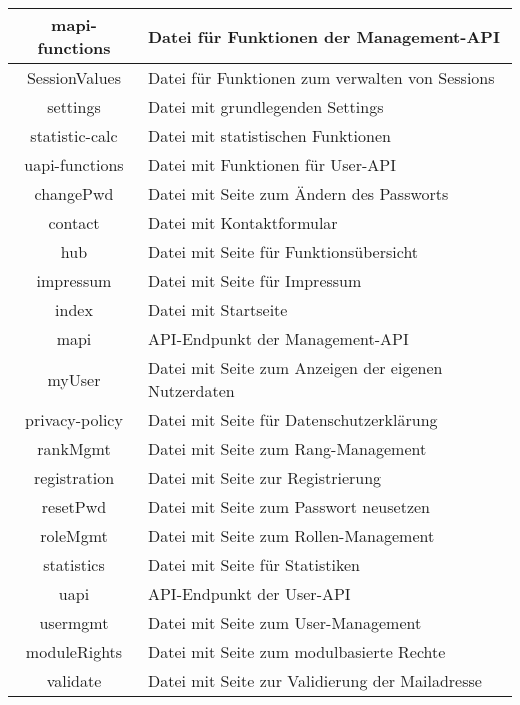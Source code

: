\begin{longtable}[H]{|c|p{10cm}|}
	mapi-functions               & Datei für Funktionen der Management-API \\ \hline
	SessionValues                & Datei für Funktionen zum verwalten von Sessions \\ \hline
	settings                     & Datei mit grundlegenden Settings \\ \hline
	statistic-calc               & Datei mit statistischen Funktionen \\ \hline
	uapi-functions               & Datei mit Funktionen für User-API \\ \hline
	changePwd                    & Datei mit Seite zum Ändern des Passworts \\ \hline
	contact                      & Datei mit Kontaktformular \\ \hline
	hub                          & Datei mit Seite für Funktionsübersicht \\ \hline
	impressum                    & Datei mit Seite für Impressum \\ \hline
	index                        & Datei mit Startseite \\ \hline
	mapi                         & API-Endpunkt der Management-API \\ \hline
	myUser                       & Datei mit Seite zum Anzeigen der eigenen Nutzerdaten \\ \hline
	privacy-policy               & Datei mit Seite für Datenschutzerklärung \\ \hline
	rankMgmt                     & Datei mit Seite zum Rang-Management \\ \hline
	registration                 & Datei mit Seite zur Registrierung \\ \hline
	resetPwd                     & Datei mit Seite zum Passwort neusetzen \\ \hline
	roleMgmt                     & Datei mit Seite zum Rollen-Management \\ \hline
	statistics                   & Datei mit Seite für Statistiken \\ \hline
	uapi                         & API-Endpunkt der User-API \\ \hline
	usermgmt                     & Datei mit Seite zum User-Management \\ \hline
	moduleRights                 & Datei mit Seite zum modulbasierte Rechte \\ \hline
	validate                     & Datei mit Seite zur Validierung der Mailadresse \\ \hline

\end{longtable}
